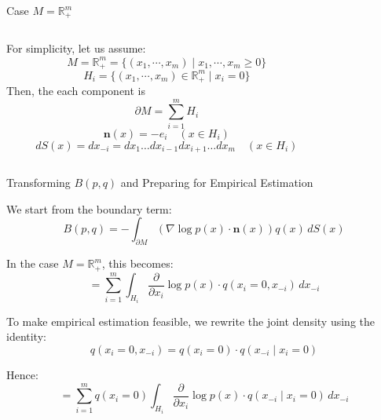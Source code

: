 \documentclass[aspectratio=169]{beamer}
\begin{document}
\begin{frame}{Case \( M = \mathbb{R}^m_+ \)}
\begin{columns}
  \begin{column}{0.55\textwidth}
    \begin{flushleft}
    For simplicity, let us assume:
    \[
    M = \mathbb{R}_+^m = \{(x_1, \cdots,x_m) \mid x_1, \cdots,x_m \geq 0\}
    \]
    \[
    H_i = \{(x_1,  \cdots,x_m) \in \mathbb{R}_+^m \mid x_i = 0\}
    \]
    Then, the each component is 
    \[
    \partial M = \sum_{i=1}^{m} H_i
    \]
    \[
    \mathbf{n}(x) = -e_i \quad (x \in H_i)
    \]
    \[
    dS(x) = dx_{-i} = dx_1 \dots dx_{i-1} dx_{i+1} \dots dx_m \quad (x \in H_i)
    \]
    \end{flushleft}
  \end{column}

  \begin{column}{0.45\textwidth}
    \begin{center}
    \end{center}
  \end{column}
\end{columns}
\end{frame}
\begin{frame}{Transforming \( B(p,q) \) and Preparing for Empirical Estimation}

We start from the boundary term:
\[
B(p, q) = - \int_{\partial M} \left( \nabla \log p(x) \cdot \mathbf{n}(x) \right) q(x)\, dS(x)
\]

In the case \( M = \mathbb{R}_+^m \), this becomes:
\[
= \sum_{i = 1}^m \int_{H_i} \frac{\partial}{\partial x_i} \log p(x) \cdot q(x_i = 0, x_{-i}) \, dx_{-i}
\]

To make empirical estimation feasible, we rewrite the joint density using the identity:
\[
q(x_i = 0, x_{-i}) = q(x_i = 0) \cdot q(x_{-i} \mid x_i = 0)
\]

Hence:
\[
= \sum_{i = 1}^m q(x_i = 0) \int_{H_i} \frac{\partial}{\partial x_i} \log p(x) \cdot q(x_{-i} \mid x_i = 0) \, dx_{-i}
\]



\end{frame}
\end{document}
